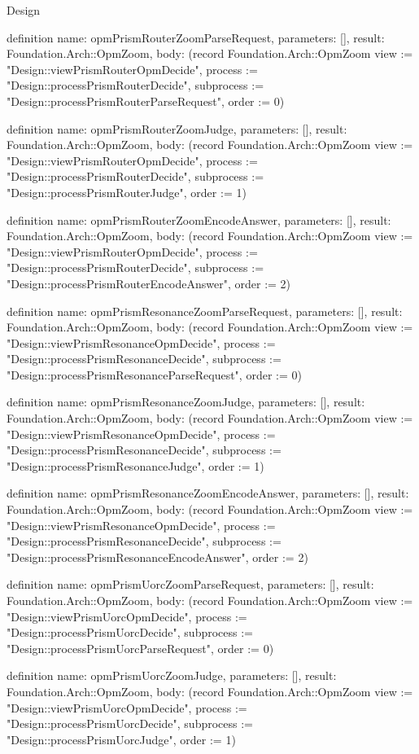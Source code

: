 \begin{lexlean}{Design}
\begin{semanticmodule}
definition{
  name: opmPrismRouterZoomParseRequest,
  parameters: [],
  result: Foundation.Arch::OpmZoom,
  body: (record Foundation.Arch::OpmZoom {view := "Design::viewPrismRouterOpmDecide", process := "Design::processPrismRouterDecide", subprocess := "Design::processPrismRouterParseRequest", order := 0})
}

definition{
  name: opmPrismRouterZoomJudge,
  parameters: [],
  result: Foundation.Arch::OpmZoom,
  body: (record Foundation.Arch::OpmZoom {view := "Design::viewPrismRouterOpmDecide", process := "Design::processPrismRouterDecide", subprocess := "Design::processPrismRouterJudge", order := 1})
}

definition{
  name: opmPrismRouterZoomEncodeAnswer,
  parameters: [],
  result: Foundation.Arch::OpmZoom,
  body: (record Foundation.Arch::OpmZoom {view := "Design::viewPrismRouterOpmDecide", process := "Design::processPrismRouterDecide", subprocess := "Design::processPrismRouterEncodeAnswer", order := 2})
}

definition{
  name: opmPrismResonanceZoomParseRequest,
  parameters: [],
  result: Foundation.Arch::OpmZoom,
  body: (record Foundation.Arch::OpmZoom {view := "Design::viewPrismResonanceOpmDecide", process := "Design::processPrismResonanceDecide", subprocess := "Design::processPrismResonanceParseRequest", order := 0})
}

definition{
  name: opmPrismResonanceZoomJudge,
  parameters: [],
  result: Foundation.Arch::OpmZoom,
  body: (record Foundation.Arch::OpmZoom {view := "Design::viewPrismResonanceOpmDecide", process := "Design::processPrismResonanceDecide", subprocess := "Design::processPrismResonanceJudge", order := 1})
}

definition{
  name: opmPrismResonanceZoomEncodeAnswer,
  parameters: [],
  result: Foundation.Arch::OpmZoom,
  body: (record Foundation.Arch::OpmZoom {view := "Design::viewPrismResonanceOpmDecide", process := "Design::processPrismResonanceDecide", subprocess := "Design::processPrismResonanceEncodeAnswer", order := 2})
}

definition{
  name: opmPrismUorcZoomParseRequest,
  parameters: [],
  result: Foundation.Arch::OpmZoom,
  body: (record Foundation.Arch::OpmZoom {view := "Design::viewPrismUorcOpmDecide", process := "Design::processPrismUorcDecide", subprocess := "Design::processPrismUorcParseRequest", order := 0})
}

definition{
  name: opmPrismUorcZoomJudge,
  parameters: [],
  result: Foundation.Arch::OpmZoom,
  body: (record Foundation.Arch::OpmZoom {view := "Design::viewPrismUorcOpmDecide", process := "Design::processPrismUorcDecide", subprocess := "Design::processPrismUorcJudge", order := 1})
}


\end{semanticmodule}
\end{lexlean}
